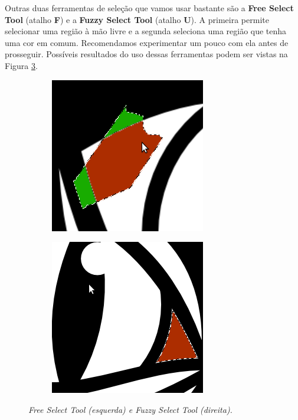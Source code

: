 \documentclass[12pt,onecolumn]{article}
\begin{document}
    Outras duas ferramentas de seleção que vamos usar bastante são a {\bf
    Free Select Tool} (atalho {\bf F}) e a {\bf Fuzzy Select Tool} (atalho
    {\bf U}). A primeira permite selecionar uma região à mão livre e a segunda
    seleciona uma região que tenha uma cor em comum. Recomendamos experimentar
    um pouco com ela antes de prosseguir. Possíveis resultados do uso dessas
    ferramentas podem ser vistas na Figura \ref{fig:select_tools}.
    
    \begin{figure}[h]
      \centering
      \begin{subfigure}{.5\textwidth}
        \centering
        \includegraphics[width=.7\linewidth]{screenshots/02-free_select.png}
        \label{fig:free_select}
      \end{subfigure}%
      \begin{subfigure}{.5\textwidth}
        \centering
        \includegraphics[width=.7\linewidth]{screenshots/03-fuzzy_select.png}
        \label{fig:fuzzy_select}
      \end{subfigure}
      \caption{
        \footnotesize
        \it
        Free Select Tool (esquerda) e Fuzzy Select Tool (direita).
      }
      \label{fig:select_tools}
    \end{figure}
    
\end{document}

